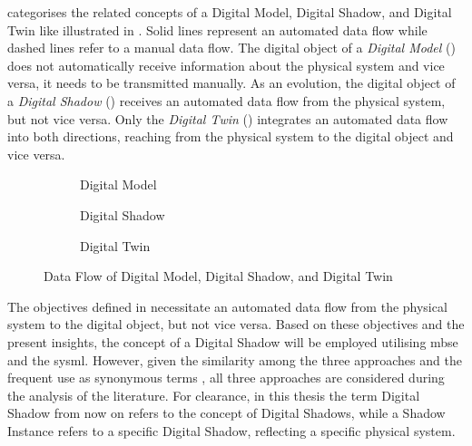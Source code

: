     \Textcite[p.~1017ff]{DMDSDTcategoricalLitReview} categorises the related concepts of a Digital Model, Digital Shadow, and Digital Twin like illustrated in . Solid lines represent an automated data flow while dashed lines refer to a manual data flow. The digital object of a \emph{Digital Model} () does not automatically receive information about the physical system and vice versa, it needs to be transmitted manually. As an evolution, the digital object of a \emph{Digital Shadow} () receives an automated data flow from the physical system, but not vice versa. Only the \emph{Digital Twin} () integrates an automated data flow into both directions, reaching from the physical system to the digital object and vice versa.
    \begin{figure}[h]
        \centering
        \begin{subfigure}[h]{.3\textwidth}
            \centering
            
            \caption{Digital Model} \label{fig:tikz:dm}
        \end{subfigure}
        \begin{subfigure}[h]{.3\textwidth}
            \centering
            
            \caption{Digital Shadow} \label{fig:tikz:ds}
        \end{subfigure}
        \begin{subfigure}[h]{.3\textwidth}
            \centering
            
            \caption{Digital Twin} \label{fig:tikz:dt}
        \end{subfigure}
        \caption[Data Flow of Digital Model, Digital Shadow, and Digital Twin]{Data Flow of Digital Model, Digital Shadow, and Digital Twin \cite[p.~1017]{DMDSDTcategoricalLitReview}} \label{fig:tikz:dmdsdt}
    \end{figure}

The objectives defined in  necessitate an automated data flow from the physical system to the digital object, but not vice versa. Based on these objectives and the present insights, the concept of a Digital Shadow will be employed utilising \acl{mbse} and the \acf{sysml}. However, given the similarity among the three approaches and the frequent use as synonymous terms \cite[p.~1020]{DMDSDTcategoricalLitReview}, all three approaches are considered during the analysis of the literature. For clearance, in this thesis the term \glqq{}Digital Shadow\grqq{} from now on refers to the concept of Digital Shadows, while a \glqq{}Shadow Instance\grqq{} refers to a specific Digital Shadow, reflecting a specific physical system. \newline